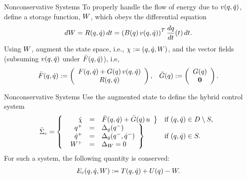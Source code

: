 \begin{frame}[t]
   {
    \begin{block}{Nonconservative Systems}
      To properly handle the flow of energy due to $v(q, \dot q)$, define a storage
      function, $W$, which obeys the differential equation
      \begin{align*}
        dW = R(q, \dot q) \, dt = \left( B(q) \, v(q, \dot q) \right)^{T}
        \frac{dq}{dt}(t) \, dt.
      \end{align*}
      Using $W$, augment the state space, i.e., $\chi := (q, \dot q, W)$, and the vector
      fields (subsuming $v(q, \dot q)$ under ${\bar {F}}(q, \dot q)$), i.e, 
      \begin{align*}
        {\bar {F}}(q, \dot q) := \left(\begin{array}{c}
            F(q, \dot q) + G(q) \, v(q, \dot q)\\
            R(q, \dot q)
          \end{array}\right), &&
        {\bar {G}}(q) := \left(\begin{array}{c}
            G(q)\\
            {\mathbf 0}
          \end{array}\right).
      \end{align*}
    \end{block}
  }
   {
    \begin{block}{Nonconservative Systems}
      Use the augmented state to define the hybrid control system
      \begin{align*}
        \bar{\Sigma}_{c} = \left\{
          \begin{array}{l l}
            \left.\begin{array}{r c l}
                \hspace{1.15em}{\dot {\chi}} &=& {\bar {F}}(q, \dot q) + {\bar {G}}(q) \, u
              \end{array}\right\}  & \mbox{if } (q, \dot q) \in D \setminus S,\\
            \left. \begin{array}{r c l}
                q^{+} &=& \Delta_{q}(q^{-})\\
                \dot q^{+} &=& \Delta_{\dot q}(q^{-}, \dot q^{-})\\
                W^{+} &=& \Delta_{W} = 0
              \end{array} \right\} & \mbox{if } (q, \dot q) \in S.
          \end{array}\right.
      \end{align*}
      For such a system, the following quantity is conserved:
      \begin{align*}
        E_{c}(q, \dot q, W) := T(q, \dot q) + U(q) - W.
      \end{align*}
    \end{block}
  }
\end{frame}

